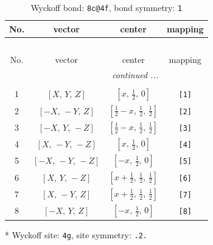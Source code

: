 \documentclass[fleqn,8pt]{jsarticle}
\begin{document}
\renewcommand{\arraystretch}{1.2}
\begin{longtable}{cccc}
\caption{Wyckoff bond: {\tt 8c@4f}, bond symmetry: {\tt 1}}
 \\
 \hline \hline
No. & vector & center & mapping \\ \hline \endfirsthead

\multicolumn{3}{l}{\tablename\ \thetable{}} \\
 \hline \hline
No. & vector & center & mapping \\ \hline \endhead

 \hline \hline
\multicolumn{3}{r}{\footnotesize\it continued ...} \\ \endfoot

 \hline \hline
\multicolumn{3}{r}{} \\ \endlastfoot

1 & $\left[ X,\, Y,\, Z \right]$ & $\left[ x,\, \frac{1}{2},\, 0 \right]$ & {\tt [1]} \\ \hline
2 & $\left[ - X,\, - Y,\, Z \right]$ & $\left[ \frac{1}{2} - x,\, \frac{1}{2},\, \frac{1}{2} \right]$ & {\tt [2]} \\ \hline
3 & $\left[ - X,\, Y,\, - Z \right]$ & $\left[ \frac{1}{2} - x,\, \frac{1}{2},\, \frac{1}{2} \right]$ & {\tt [3]} \\ \hline
4 & $\left[ X,\, - Y,\, - Z \right]$ & $\left[ x,\, \frac{1}{2},\, 0 \right]$ & {\tt [4]} \\ \hline
5 & $\left[ - X,\, - Y,\, - Z \right]$ & $\left[ - x,\, \frac{1}{2},\, 0 \right]$ & {\tt [5]} \\ \hline
6 & $\left[ X,\, Y,\, - Z \right]$ & $\left[ x + \frac{1}{2},\, \frac{1}{2},\, \frac{1}{2} \right]$ & {\tt [6]} \\ \hline
7 & $\left[ X,\, - Y,\, Z \right]$ & $\left[ x + \frac{1}{2},\, \frac{1}{2},\, \frac{1}{2} \right]$ & {\tt [7]} \\ \hline
8 & $\left[ - X,\, Y,\, Z \right]$ & $\left[ - x,\, \frac{1}{2},\, 0 \right]$ & {\tt [8]} \\
\end{longtable}
* Wyckoff site: {\tt 4g}, site symmetry: {\tt .2.}
\renewcommand{\arraystretch}{1.2}
\end{document}

